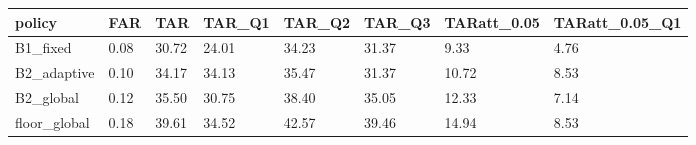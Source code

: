 \begin{tabular}{llllllll}
\hline
policy & FAR & TAR & TAR\_Q1 & TAR\_Q2 & TAR\_Q3 & TARatt\_0.05 & TARatt\_0.05\_Q1 \\
\hline
B1\_fixed & 0.08 & 30.72 & 24.01 & 34.23 & 31.37 & 9.33 & 4.76 \\
B2\_adaptive & 0.10 & 34.17 & 34.13 & 35.47 & 31.37 & 10.72 & 8.53 \\
B2\_global & 0.12 & 35.50 & 30.75 & 38.40 & 35.05 & 12.33 & 7.14 \\
floor\_global & 0.18 & 39.61 & 34.52 & 42.57 & 39.46 & 14.94 & 8.53 \\
\hline
\end{tabular}
